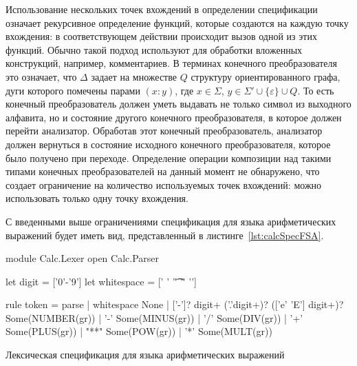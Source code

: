 \documentclass[10pt, conference, compsocconf]{IEEEtran}
\begin{document}
Использование нескольких точек вхождений в определении спецификации означает рекурсивное определение функций, которые создаются на каждую точку вхождения: в соответствующем действии происходит вызов одной из этих функций. Обычно такой подход используют для обработки вложенных конструкций, например, комментариев. В терминах конечного преобразователя это означает, что $\Delta$ задает на множестве $Q$ структуру ориентированного графа, дуги которого помечены парами $(x : y)$, где $x \in \Sigma$, $y \in \Sigma' \cup \{\varepsilon \} \cup Q$.  То есть конечный преобразователь должен уметь выдавать не только символ из выходного алфавита, но и состояние другого конечного преобразователя, в которое должен перейти анализатор. Обработав этот конечный преобразователь, анализатор должен вернуться в состояние исходного конечного преобразователя, которое было получено при переходе.  Определение операции композиции над такими типами конечных преобразователей на данный момент не обнаружено, что создает ограничение на количество используемых точек вхождений: можно использовать только одну точку вхождения.  
% 
% 

С введенными выше ограничениями  спецификация для языка арифметических выражений будет иметь вид, представленный в листинге~\ref{lst:calcSpecFSA}.


\begin{listing}[h]
\begin{pyglist}[language=csharp,numbers=none,numbersep=5pt]
{
module Calc.Lexer
open Calc.Parser
}

let digit = ['0'-'9']
let whitespace = [' ' '\t' '\r' '\n']

rule token = parse
| whitespace { None }
| ['-']? digit+ ('.'digit+)? (['e' 'E'] digit+)? 
       { Some(NUMBER(gr)) }
| '-'  { Some(MINUS(gr)) }
| '/'  { Some(DIV(gr)) }
| '+'  { Some(PLUS(gr)) }
| "**" { Some(POW(gr)) }
| '*'  { Some(MULT(gr)) }
\end{pyglist}
\caption{Лексическая спецификация для языка арифметических выражений}
\label{lst:calcSpecFSA}
\end{listing}
\end{document}
